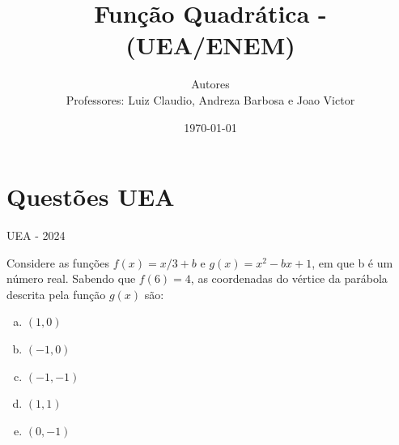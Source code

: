 \documentclass[11pt]{beamer}
\author[CETi / IFAM CMC]{Autores \\ Professores: Luiz Claudio, Andreza Barbosa e Joao Victor}
\title{Função Quadrática - (UEA/ENEM)}
\institute[]{CETi BILÍNGUE GILBERTO MESTRINHO \par INSTITUTO FEDERAL DO AMAZONAS }
\date{\today}
\begin{document}
\justifying
\onehalfspacing 

\begin{frame}
    \titlepage
\end{frame}

\section{Questões UEA}

\begin{frame}{UEA - 2024}

    Considere as funções $f(x)={x}/{3}+b$ e $g(x)=x^{2}-bx+1$, em que b é um número real. Sabendo que $f(6)=4$, as coordenadas do vértice da parábola descrita pela função $g(x)$ são:

    \begin{enumerate}[a)]
            \item $(1,0)$ %
            \item $(-1,0)$
            \item $(-1,-1)$
            \item $(1,1)$ 
            \item $(0,-1)$

        \end{enumerate}

\end{frame}
\end{document}
